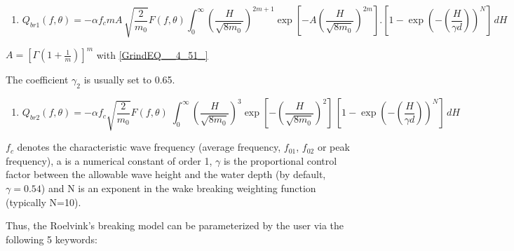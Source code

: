 \begin{enumerate}
\item  {}
\begin{equation} \label{GrindEQ__4_50_}
Q_{br1} \left(f,\theta \right)=-\alpha f_{c} mA\, \sqrt{\frac{2}{m_{0} } } F\left(f,\theta \right)\int _{0}^{\infty }\left(\frac{H}{\sqrt{8m_{0} } } \right)^{2m+1} \exp \left[-A\left(\frac{H}{\sqrt{8m_{0} } } \right)^{2m} \right].\left[1-\exp \left(-\left(\frac{H}{\gamma d} \right)\right)^{N} \right] \, dH
\end{equation}
\end{enumerate}

$A=\left[\Gamma \left(1+\frac{1}{m} \right)\right]^{m} $ with  \eqref{GrindEQ__4_51_}

The coefficient $\gamma _{2} $ is usually set to 0.65.

\begin{enumerate}
\item  {}
\begin{equation} \label{GrindEQ__4_52_}
Q_{br2} \left(f,\theta \right)=-\alpha f_{c} \sqrt{\frac{2}{m_{0} } } F\left(f,\theta \right)\; \int _{0}^{\infty }\left(\frac{H}{\sqrt{8m_{0} } } \right)^{3} \exp \left[-\left(\frac{H}{\sqrt{8m_{0} } } \right)^{2} \right]\, \left[1-\exp \left(-\left(\frac{H}{\gamma d} \right)\right)^{N} \right]\,  dH
\end{equation}
\end{enumerate}
$f_{c} $ denotes the characteristic wave frequency (average frequency, $f_{01} $, $f_{02} $ or peak frequency), a is a numerical constant of order 1, $\gamma $ is the proportional control factor between the allowable wave height and the water depth (by default, $\gamma =0.54$) and N is an exponent in the wake breaking weighting function (typically N=10).

 Thus, the Roelvink's breaking model can be parameterized by the user via the following 5 keywords:

